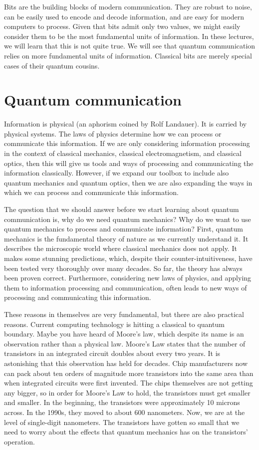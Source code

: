 Bits are the building blocks of modern communication.
They are robust to noise, can be easily used to encode and decode information, and are easy for modern computers to process.
Given that bits admit only two values, we might easily consider them to be the most fundamental units of information.
In these lectures, we will learn that this is not quite true.
We will see that quantum communication relies on more fundamental units of information.
Classical bits are merely special cases of their quantum cousins.


\section{Quantum communication}

Information is physical (an aphorism coined by Rolf Landauer).
It is carried by physical systems. The laws of physics determine how we can process or communicate this information.
If we are only considering information processing in the context of classical mechanics, classical electromagnetism, and classical optics, then this will give us tools and ways of processing and communicating the information classically.
However, if we expand our toolbox to include also quantum mechanics and quantum optics, then we are also expanding the ways in which we can process and communicate this information.

The question that we should answer before we start learning about quantum communication is, why do we need quantum mechanics?
Why do we want to use quantum mechanics to process and communicate information? First, quantum mechanics is the fundamental theory of nature as we currently understand it.
It describes the microscopic world where classical mechanics does not apply.
It makes some stunning predictions, which, despite their counter-intuitiveness, have been tested very thoroughly over many decades.
So far, the theory has always been proven correct.
Furthermore, considering new laws of physics, and applying them to information processing and communication, often leads to new ways of processing and communicating this information.

These reasons in themselves are very fundamental, but there are also practical reasons.
Current computing technology is hitting a classical to quantum boundary.
Maybe you have heard of Moore's law, which despite its name is an observation rather than a physical law.
Moore's Law states that the number of transistors in an integrated circuit doubles about every two years.
It is astonishing that this observation has held for decades.
Chip manufacturers now can pack about ten orders of magnitude more transistors into the same area than when integrated circuits were first invented. The chips themselves are not getting any bigger, so in order for Moore's Law to hold, the transistors must get smaller and smaller.
In the beginning, the transistors were approximately 10 microns across.
In the 1990s, they moved to about 600 nanometers.
Now, we are at the level of single-digit nanometers.
The transistors have gotten so small that we need to worry about the effects that quantum mechanics has on the transistors' operation.

